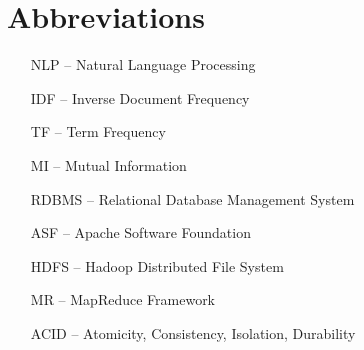 \section*{Abbreviations}

\begin{itemize}[leftmargin=2cm, topsep=0pt, partopsep=5pt,itemsep=0pt,parsep=0pt]
\item[NLP --] Natural Language Processing
\item[IDF --] Inverse Document Frequency
\item[TF --] Term Frequency
\item[MI --] Mutual Information
\item[RDBMS --] Relational Database Management System
\item[ASF --] Apache Software Foundation 
\item [HDFS --] Hadoop Distributed File System
\item [MR --] MapReduce Framework
\item [ACID --] Atomicity, Consistency, Isolation, Durability



\end{itemize}
